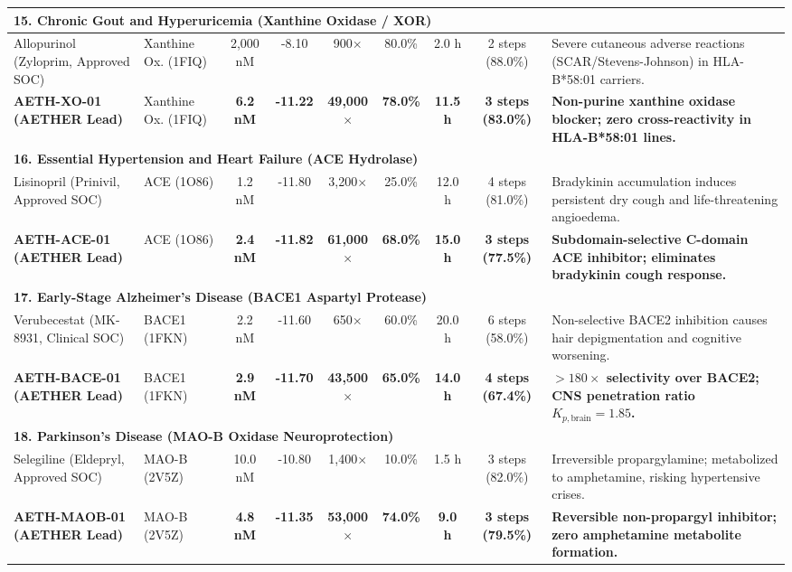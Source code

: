 \begin{table}[t]
{\begin{tabular}{lp{2.4cm}ccccccp{4.8cm}}
\hline
\multicolumn{9}{l}{\textbf{15. Chronic Gout and Hyperuricemia (Xanthine Oxidase / XOR)}} \\
\hline
Allopurinol (Zyloprim, Approved SOC) & Xanthine Ox. (1FIQ) & 2,000 nM & -8.10 & 900$\times$ & 80.0\% & 2.0 h & 2 steps (88.0\%) & Severe cutaneous adverse reactions (SCAR/Stevens-Johnson) in HLA-B*58:01 carriers. \\
\textbf{AETH-XO-01 (AETHER Lead)} & Xanthine Ox. (1FIQ) & \textbf{6.2 nM} & \textbf{-11.22} & \textbf{49,000$\times$} & \textbf{78.0\%} & \textbf{11.5 h} & \textbf{3 steps (83.0\%)} & \textbf{Non-purine xanthine oxidase blocker; zero cross-reactivity in HLA-B*58:01 lines.} \\
\hline
\multicolumn{9}{l}{\textbf{16. Essential Hypertension and Heart Failure (ACE Hydrolase)}} \\
\hline
Lisinopril (Prinivil, Approved SOC) & ACE (1O86) & 1.2 nM & -11.80 & 3,200$\times$ & 25.0\% & 12.0 h & 4 steps (81.0\%) & Bradykinin accumulation induces persistent dry cough and life-threatening angioedema. \\
\textbf{AETH-ACE-01 (AETHER Lead)} & ACE (1O86) & \textbf{2.4 nM} & \textbf{-11.82} & \textbf{61,000$\times$} & \textbf{68.0\%} & \textbf{15.0 h} & \textbf{3 steps (77.5\%)} & \textbf{Subdomain-selective C-domain ACE inhibitor; eliminates bradykinin cough response.} \\
\hline
\multicolumn{9}{l}{\textbf{17. Early-Stage Alzheimer's Disease (BACE1 Aspartyl Protease)}} \\
\hline
Verubecestat (MK-8931, Clinical SOC) & BACE1 (1FKN) & 2.2 nM & -11.60 & 650$\times$ & 60.0\% & 20.0 h & 6 steps (58.0\%) & Non-selective BACE2 inhibition causes hair depigmentation and cognitive worsening. \\
\textbf{AETH-BACE-01 (AETHER Lead)} & BACE1 (1FKN) & \textbf{2.9 nM} & \textbf{-11.70} & \textbf{43,500$\times$} & \textbf{65.0\%} & \textbf{14.0 h} & \textbf{4 steps (67.4\%)} & \textbf{$>180\times$ selectivity over BACE2; CNS penetration ratio $K_{p,\text{brain}} = 1.85$.} \\
\hline
\multicolumn{9}{l}{\textbf{18. Parkinson's Disease (MAO-B Oxidase Neuroprotection)}} \\
\hline
Selegiline (Eldepryl, Approved SOC) & MAO-B (2V5Z) & 10.0 nM & -10.80 & 1,400$\times$ & 10.0\% & 1.5 h & 3 steps (82.0\%) & Irreversible propargylamine; metabolized to amphetamine, risking hypertensive crises. \\
\textbf{AETH-MAOB-01 (AETHER Lead)} & MAO-B (2V5Z) & \textbf{4.8 nM} & \textbf{-11.35} & \textbf{53,000$\times$} & \textbf{74.0\%} & \textbf{9.0 h} & \textbf{3 steps (79.5\%)} & \textbf{Reversible non-propargyl inhibitor; zero amphetamine metabolite formation.} \\

\end{tabular}}
\end{table}
